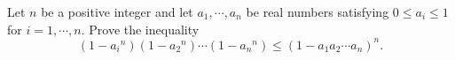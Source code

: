 Let $n$ be a positive integer and let $a_1,\cdots ,a_n$ be real numbers satisfying $0\le a_i\le 1$ for $i=1,\cdots ,n.$ Prove the inequality \[(1-{a_i}^n)(1-{a_2}^n)\cdots (1-{a_n}^n)\le (1-a_1a_2\cdots a_n)^n.\]